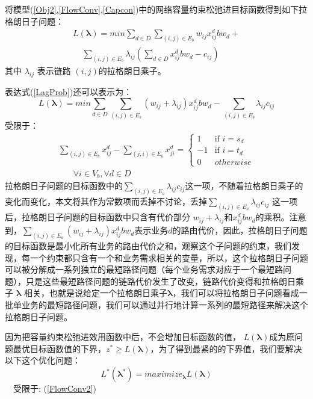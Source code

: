 将模型(\ref{Obj2},\ref{FlowConv},\ref{Capcon})中的网络容量约束松弛进目标函数得到如下拉格朗日子问题：
\begin{equation}\label{LagProb}
\begin{split}
L(\mathbf{\lambda})= min\sum\limits_{d \in D}\sum\limits_{(i,j) \in E_b} w_{ij}x_{ij}^d bw_d+ \\ ~~~~~\sum\limits_{(i,j) \in E_b}\lambda_{ij}(\sum\limits_{d \in D} x_{ij}^d bw_d-c_{ij})
\end{split}
\end{equation}
其中 $\lambda_{ij}$ 表示链路 $(i,j)$的拉格朗日乘子。

表达式(\ref{LagProb})还可以表示为：
\begin{equation}\label{Lagprob1}
L(\mathbf{\lambda})= min\sum\limits_{d \in D}\sum\limits_{(i,j) \in E_b} (w_{ij}+\lambda_{ij})x_{ij}^dbw_d -\sum\limits_{(i,j) \in E_b}\lambda_{ij}c_{ij}
\end{equation}
受限于：
\begin{equation}\label{FlowConv2}
\begin{split}
\sum\limits_{(i,j) \in E_b} x_{ij}^d - \sum\limits_{(j,i) \in E_b} x_{ji}^d
=\begin{cases}
1 & \text{if $i = s_d$}\\
-1 & \text{if $i = t_d$} \\
0 &{otherwise}
\end{cases}
\\~~~~~~~~\forall i\in V_b, \forall d\in D
\end{split}
\end{equation}
拉格朗日子问题的目标函数中的$\sum_{(i,j) \in E_a}\lambda_{ij}c_{ij}$这一项，不随着拉格朗日乘子的变化而变化，本文将其作为常数项而丢掉不讨论，丢掉$\sum_{(i,j) \in E_a}\lambda_{ij}c_{ij}$ 这一项后，拉格朗日子问题的目标函数中只含有代价部分 $w_{ij}+\lambda_{ij}$和$x_{ij}^d bw_d$的乘积。注意到，$\sum_{(i,j) \in E_a} (w_{ij}+\lambda_{ij})x_{ij}^d bw_d$表示业务$d$的路由代价，因此，拉格朗日子问题的目标函数是最小化所有业务的路由代价之和，观察这个子问题的约束，我们发现，每一个约束都只含有一个和业务需求相关的变量，所以，这个拉格朗日子问题可以被分解成一系列独立的最短路径问题（每个业务需求对应于一个最短路问题），只是这些最短路径问题的链路代价发生了改变，链路代价变得和拉格朗日乘子 $\mathbf{\lambda}$ 相关，也就是说给定一个拉格朗日乘子$\mathbf{\lambda}$，我们可以将拉格朗日子问题看成一批单业务的最短路径问题，我们可以通过并行地计算一系列的最短路径来解决这个拉格朗日子问题。

因为把容量约束松弛进效用函数中后，不会增加目标函数的值， $L(\mathbf{\lambda})$成为原问题最优目标函数值的下界，$z^* \ge L(\mathbf{\lambda})$，为了得到最紧的的下界值，我们要解决以下这个优化问题：
\begin{equation}\label{dual}
L^*(\mathbf{\lambda^*}) = maximize_{\mathbf{\lambda}}L(\mathbf{\lambda})
\end{equation}
~~受限于: (\ref{FlowConv2})
\vskip 0.2cm

